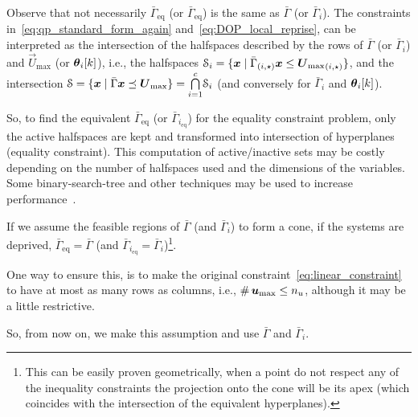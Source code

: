 \documentclass[../main.tex]{subfiles}
\begin{document}
\begin{remark}
  Observe that not necessarily $\bar{\Gamma}_{\text{eq}}$ (or $\bar{\Gamma}_{\text{eq}}$) is the same as $\bar{\Gamma}$ (or $\bar{\Gamma}_{i}$).
  The constraints in~\eqref{eq:qp_standard_form_again} and~\eqref{eq:DOP_local_reprise}, can be interpreted as the intersection of the halfspaces described by the rows of $\bar{\Gamma}$ (or $\bar{\Gamma}_{i}$) and $\vec{U}_{\max}$ (or $\thetaik$), i.e., the halfspaces
  ${\set{S}_i=\setbuild{\vec{x}}{\elem[i,\star]{{\bar{\Gamma}}}\vec{x}\leq\elem[i,\star]{\vec{U}_{\max}}}}$,
  and the intersection
  ${\set{S}=\setbuild{\vec{x}}{\bar{\Gamma}\vec{x}\preceq\vec{U}_{\max}}=\bigcap\limits_{i=1}^{c}}\set{S}_{i}$
  (and conversely for $\bar{\Gamma}_{i}$ and $\thetaik$).

  So, to find the equivalent $\bar{\Gamma}_{\text{eq}}$ (or $\bar{\Gamma}_{i_{\text{eq}}}$) for the equality constraint problem, only the active halfspaces are kept and transformed into intersection of hyperplanes (equality constraint).
  This computation of active/inactive sets may be costly depending on the number of halfspaces used and the dimensions of the variables.
  Some binary-search-tree and other techniques may be used to increase performance~\cite{SchulzeEtAl2022,AlessioBemporad2009}.

  If we assume the feasible regions of $\bar{\Gamma}$ (and $\bar{\Gamma}_{i}$) to form a cone, if the systems are deprived, $\bar{\Gamma}_{\text{eq}}=\bar{\Gamma}$ (and $\bar{\Gamma}_{i_\text{eq}}=\bar{\Gamma}_i$)\footnote{This can be easily proven geometrically, when a point do not respect any of the inequality constraints the projection onto the cone will be its apex (which coincides with the intersection of the equivalent hyperplanes).}.

One way to ensure this, is to make the original constraint~\eqref{eq:linear_constraint} to have at most as many rows as columns, i.e., $\card{\vec{u}_{\max}}\leq n_{u}$, although it may be a little restrictive.

So, from now on, we make this assumption and use $\bar{\Gamma}$ and $\bar{\Gamma}_{i}$.

\end{remark}
\end{document}
